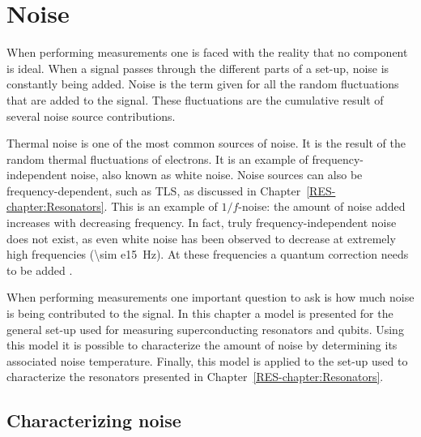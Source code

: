 
\newcommand{\vrms}{\text{v}_\text{n}^\text{rms}}
\newcommand{\vsq}{\overline{\text{v}_\text{n}^2}}
\newcommand{\vn}{\text{v}_\text{n}}
\newcommand{\vin}{\text{v}_\text{in}}
\newcommand{\vout}{\text{v}_\text{out}}
\newcommand{\Sin}{\text{S}_{\vn}^\text{in}}
\newcommand{\Sout}{\text{S}_{\vn}^\text{out}}
\newcommand{\Svn}{\text{S}_{\vn}}


\chapter{Noise}
\label{ch:noise}

When performing measurements one is faced with the reality that no component is ideal. When a signal passes through the different parts of a set-up, noise is constantly being added. Noise is the term given for all the random fluctuations that are added to the signal. These fluctuations are the cumulative result of several noise source contributions.

Thermal noise is one of the most common sources of noise. It is the result of the random thermal fluctuations of electrons. It is an example of frequency-independent noise, also known as white noise. Noise sources can also be frequency-dependent, such as TLS, as discussed in Chapter~\ref{RES-chapter:Resonators}. This is an example of $1/f$-noise: the amount of noise added increases with decreasing frequency. In fact, truly frequency-independent noise does not exist, as even white noise has been observed to decrease at extremely high frequencies (\SI{\sim e15}{\hertz}). At these frequencies a quantum correction needs to be added \cite[p50]{vasilescu2006electronic}.

When performing measurements one important question to ask is how much noise is being contributed to the signal. In this chapter a model is presented for the general set-up used for measuring superconducting resonators and qubits. Using this model it is possible to characterize the amount of noise by determining its associated noise temperature. Finally, this model is applied to the set-up used to characterize the resonators presented in Chapter~\ref{RES-chapter:Resonators}.

\section{Characterizing noise}

